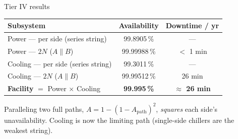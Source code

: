 \begin{frame}{Tier IV results}
  \centering
  \renewcommand{\arraystretch}{1.25}
  \begin{tabular}{lcc}
    \toprule
    \textbf{Subsystem} & \textbf{Availability} & \textbf{Downtime / yr} \\
    \midrule
    Power --- per side (series string) & 99.8905\,\% & --- \\
    \rowcolor{surf}
    Power --- $2N$ ($A \parallel B$)   & 99.99988\,\% & $<$ 1 min \\
    \addlinespace
    Cooling --- per side (series string) & 99.3011\,\% & --- \\
    \rowcolor{surf}
    Cooling --- $2N$ ($A \parallel B$) & 99.99512\,\% & 26 min \\
    \midrule
    \rowcolor{surf2}
    \textbf{Facility} $=$ Power $\times$ Cooling & \textbf{99.995\,\%} & \textbf{$\approx$ 26 min} \\
    \bottomrule
  \end{tabular}

  \vspace{0.8em}
  \small Paralleling two full paths, $A = 1-(1-A_{\text{path}})^2$, \emph{squares} each side's
  unavailability. Cooling is now the limiting path (single-side chillers are the weakest string).
\end{frame}


